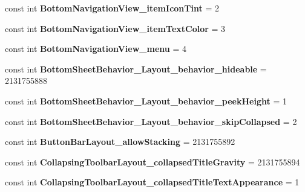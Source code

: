 \begin{DoxyCompactItemize}
const int {\bfseries Bottom\+Navigation\+View\+\_\+item\+Icon\+Tint} = 2
\item 
\mbox{\label{classst_delivery_1_1_resource_1_1_styleable_aa1edcf2717eeb0fe21ccaf19b2df3b1f}} 
const int {\bfseries Bottom\+Navigation\+View\+\_\+item\+Text\+Color} = 3
\item 
\mbox{\label{classst_delivery_1_1_resource_1_1_styleable_a44c68e105727f5d5621b2da77e8d0809}} 
const int {\bfseries Bottom\+Navigation\+View\+\_\+menu} = 4
\item 
\mbox{\label{classst_delivery_1_1_resource_1_1_styleable_a7b02b4df4209369332f6691bf4634252}} 
const int {\bfseries Bottom\+Sheet\+Behavior\+\_\+\+Layout\+\_\+behavior\+\_\+hideable} = 2131755888
\item 
\mbox{\label{classst_delivery_1_1_resource_1_1_styleable_a7d2af2291a49ab3e645b6c474e22b0d4}} 
const int {\bfseries Bottom\+Sheet\+Behavior\+\_\+\+Layout\+\_\+behavior\+\_\+peek\+Height} = 1
\item 
\mbox{\label{classst_delivery_1_1_resource_1_1_styleable_a806f53067d484dfe91892537c7c13b39}} 
const int {\bfseries Bottom\+Sheet\+Behavior\+\_\+\+Layout\+\_\+behavior\+\_\+skip\+Collapsed} = 2
\item 
\mbox{\label{classst_delivery_1_1_resource_1_1_styleable_a5e3de5a20c37ad5422c462d89c192077}} 
const int {\bfseries Button\+Bar\+Layout\+\_\+allow\+Stacking} = 2131755892
\item 
\mbox{\label{classst_delivery_1_1_resource_1_1_styleable_aea2e088306db476dcd1bc9e565442ee0}} 
const int {\bfseries Collapsing\+Toolbar\+Layout\+\_\+collapsed\+Title\+Gravity} = 2131755894
\item 
\mbox{\label{classst_delivery_1_1_resource_1_1_styleable_a012f8cdd441812ff167e9173cecf648e}} 
const int {\bfseries Collapsing\+Toolbar\+Layout\+\_\+collapsed\+Title\+Text\+Appearance} = 1

\end{DoxyCompactItemize}
